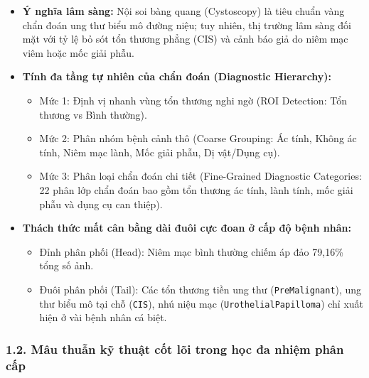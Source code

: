 \documentclass[
  11pt,
  a4paper,
]{article}
\providecommand{\tightlist}{%
  \setlength{\itemsep}{0pt}\setlength{\parskip}{0pt}}
\begin{document}
\begin{itemize}
\tightlist
\item
  \textbf{Ý nghĩa lâm sàng:} Nội soi bàng quang (Cystoscopy) là tiêu
  chuẩn vàng chẩn đoán ung thư biểu mô đường niệu; tuy nhiên, thị trường
  lâm sàng đối mặt với tỷ lệ bỏ sót tổn thương phẳng (CIS) và cảnh báo
  giả do niêm mạc viêm hoặc mốc giải phẫu.
\item
  \textbf{Tính đa tầng tự nhiên của chẩn đoán (Diagnostic Hierarchy):}

  \begin{itemize}
  \tightlist
  \item
    Mức 1: Định vị nhanh vùng tổn thương nghi ngờ (ROI Detection: Tổn
    thương vs Bình thường).
  \item
    Mức 2: Phân nhóm bệnh cảnh thô (Coarse Grouping: Ác tính, Không ác
    tính, Niêm mạc lành, Mốc giải phẫu, Dị vật/Dụng cụ).
  \item
    Mức 3: Phân loại chẩn đoán chi tiết (Fine-Grained Diagnostic
    Categories: 22 phân lớp chẩn đoán bao gồm tổn thương ác tính, lành
    tính, mốc giải phẫu và dụng cụ can thiệp).
  \end{itemize}
\item
  \textbf{Thách thức mất cân bằng dài đuôi cực đoan ở cấp độ bệnh nhân:}

  \begin{itemize}
  \tightlist
  \item
    Đỉnh phân phối (Head): Niêm mạc bình thường chiếm áp đảo 79,16\%
    tổng số ảnh.
  \item
    Đuôi phân phối (Tail): Các tổn thương tiền ung thư
    (\texttt{PreMalignant}), ung thư biểu mô tại chỗ (\texttt{CIS}), nhú
    niệu mạc (\texttt{UrothelialPapilloma}) chỉ xuất hiện ở vài bệnh
    nhân cá biệt.
  \end{itemize}
\end{itemize}

\subsubsection{1.2. Mâu thuẫn kỹ thuật cốt lõi trong học đa nhiệm phân
cấp}\label{muxe2u-thuux1eabn-kux1ef9-thuux1eadt-cux1ed1t-luxf5i-trong-hux1ecdc-ux111a-nhiux1ec7m-phuxe2n-cux1ea5p}
\end{document}
